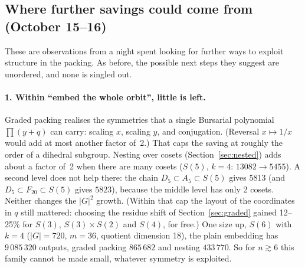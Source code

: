 \documentclass[11pt]{article}
\theoremstyle{definition}
\theoremstyle{remark}
\begin{document}
\subsection{Where further savings could come from (October 15--16)}

These are observations from a night spent looking for further ways to exploit
structure in the packing. As before, the possible next steps they suggest are
unordered, and none is singled out.

\paragraph{1. Within ``embed the whole orbit'', little is left.}
Graded packing realises the symmetries that a single Bursarial polynomial
$\prod(y + q)$ can carry: scaling $x$, scaling $y$, and conjugation. (Reversal
$x \mapsto 1/x$ would add at most another factor of~2.) That caps the saving
at roughly the order of a dihedral subgroup. Nesting over cosets
(Section~\ref{sec:nested}) adds about a factor of~2 when there are many cosets
($S(5)$, $k = 4$: $13082 \to 5455$). A second level does not help there: the
chain $D_5 \subset A_5 \subset S(5)$ gives $5813$ (and
$D_5 \subset F_{20} \subset S(5)$ gives $5823$), because the middle level has only
2 cosets. Neither changes the $|G|^2$ growth. (Within that cap the layout of
the coordinates in $q$ still mattered: choosing the residue shift of
Section~\ref{sec:graded} gained 12--25\% for $S(3)$, $S(3)\times S(2)$ and $S(4)$, for
free.) One size up, $S(6)$ with $k = 4$
($|G| = 720$, $m = 36$, quotient dimension 18), the plain embedding has
$9\,085\,320$ outputs, graded packing $865\,682$ and nesting $433\,770$. So for
$n \gtrsim 6$ this family cannot be made small, whatever symmetry is exploited.
\end{document}
